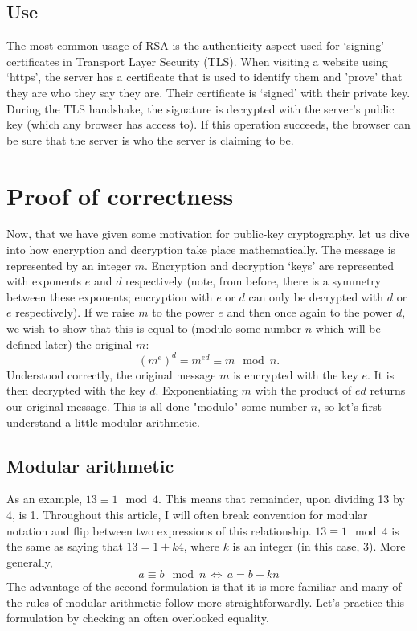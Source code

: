 \documentclass[]{scrartcl}
\theoremstyle{definition}
\begin{document}
\subsection{Use}
The most common usage of RSA is the authenticity aspect used for `signing' certificates in Transport Layer Security (TLS). When visiting a website using `https', the server has a certificate that is used to identify them and 'prove' that they are who they say they are. Their certificate is `signed' with their private key. During the TLS handshake, the signature is decrypted with the server's public key (which any browser has access to). If this operation succeeds, the browser can be sure that the server is who the server is claiming to be.

\section{Proof of correctness}\label{sec:poc}
Now, that we have given some motivation for public-key cryptography, let us dive into how encryption and decryption take place mathematically. The message is represented by an integer $m$. Encryption and decryption `keys' are represented with exponents $e$ and $d$ respectively (note, from before, there is a symmetry between these exponents; encryption with $e$ or $d$ can only be decrypted with $d$ or $e$ respectively). If we raise $m$ to the power $e$ and then once again to the power $d$, we wish to show that this is equal to (modulo some number $n$ which will be defined later) the original $m$: 
\begin{equation}\label{eqn:statement}
    (m^e)^d = m^{ed} \equiv m \mod n.
\end{equation}
Understood correctly, the original message $m$ is encrypted with the key $e$. It is then decrypted with the key $d$. Exponentiating $m$ with the product of $ed$ returns our original message. This is all done "modulo" some number $n$, so let's first understand a little modular arithmetic.
\subsection{Modular arithmetic}
As an example, $13 \equiv 1 \mod 4$. This means that remainder, upon dividing 13 by 4, is 1. Throughout this article, I will often break convention for modular notation and flip between two expressions of this relationship. $13 \equiv 1 \mod 4$ is the same as saying that $13 = 1 + k4$, where $k$ is an integer (in this case, 3). More generally,
\begin{equation}
    a \equiv b \mod n \, \Leftrightarrow \, a = b + kn
\end{equation}
The advantage of the second formulation is that it is more familiar and many of the rules of modular arithmetic follow more straightforwardly. Let's practice this formulation by checking an often overlooked equality.
\end{document}
